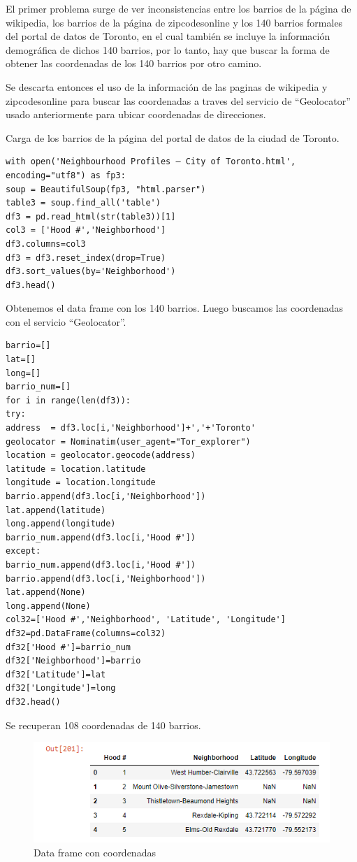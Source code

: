\documentclass[10pt,a4paper,arial, spanish]{article}
\begin{document}
El primer problema surge de ver inconsistencias entre los barrios de la página de wikipedia, los barrios de la página de zipcodesonline y los 140 barrios formales del portal de datos de Toronto, en el cual también se incluye la información demográfica de dichos 140 barrios, por lo tanto, hay que buscar la forma de obtener las coordenadas de los 140 barrios por otro camino.

Se descarta entonces el uso de la información de las paginas de wikipedia y zipcodesonline para buscar las coordenadas a traves del servicio de ``Geolocator'' usado anteriormente para ubicar coordenadas de direcciones.   

Carga de los barrios de la página del portal de datos de la ciudad de Toronto.
\begin{verbatim}
with open('Neighbourhood Profiles – City of Toronto.html', encoding="utf8") as fp3:
soup = BeautifulSoup(fp3, "html.parser")
table3 = soup.find_all('table')
df3 = pd.read_html(str(table3))[1]
col3 = ['Hood #','Neighborhood']
df3.columns=col3
df3 = df3.reset_index(drop=True)
df3.sort_values(by='Neighborhood')
df3.head()
\end{verbatim}

Obtenemos el data frame con los 140 barrios. Luego buscamos las coordenadas con el servicio ``Geolocator''.
\begin{verbatim}
barrio=[]
lat=[]
long=[]
barrio_num=[]
for i in range(len(df3)):
try:
address  = df3.loc[i,'Neighborhood']+','+'Toronto'
geolocator = Nominatim(user_agent="Tor_explorer")
location = geolocator.geocode(address)
latitude = location.latitude
longitude = location.longitude
barrio.append(df3.loc[i,'Neighborhood'])
lat.append(latitude)
long.append(longitude)
barrio_num.append(df3.loc[i,'Hood #'])
except:
barrio_num.append(df3.loc[i,'Hood #'])
barrio.append(df3.loc[i,'Neighborhood'])
lat.append(None)
long.append(None)
col32=['Hood #','Neighborhood', 'Latitude', 'Longitude']
df32=pd.DataFrame(columns=col32)
df32['Hood #']=barrio_num
df32['Neighborhood']=barrio
df32['Latitude']=lat
df32['Longitude']=long
df32.head()\end{verbatim}
Se recuperan 108 coordenadas de 140 barrios.
\begin{figure}[H]
	\centering
	\includegraphics[scale=0.5]{df1}
	\caption[Data frame con coordenadas]{Data frame con coordenadas}
	\label{fig:df1}
\end{figure}
\end{document}
